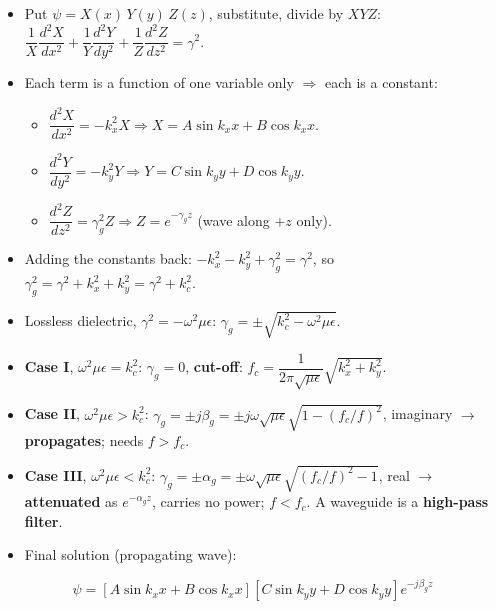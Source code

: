 \begin{itemize}
  \item Put $\psi = X(x)\,Y(y)\,Z(z)$, substitute, divide by $XYZ$:
    $\dfrac{1}{X}\dfrac{d^2X}{dx^2} + \dfrac{1}{Y}\dfrac{d^2Y}{dy^2}
    + \dfrac{1}{Z}\dfrac{d^2Z}{dz^2} = \gamma^2$.
  \item Each term is a function of one variable only $\Rightarrow$ each is a constant:
  \begin{itemize}
    \item $\dfrac{d^2X}{dx^2} = -k_x^2 X \Rightarrow X = A\sin k_x x + B\cos k_x x$.
    \item $\dfrac{d^2Y}{dy^2} = -k_y^2 Y \Rightarrow Y = C\sin k_y y + D\cos k_y y$.
    \item $\dfrac{d^2Z}{dz^2} = \gamma_g^2 Z \Rightarrow Z = e^{-\gamma_g z}$ (wave along $+z$ only).
  \end{itemize}
  \item Adding the constants back: $-k_x^2 - k_y^2 + \gamma_g^2 = \gamma^2$, so
    $\boxed{\gamma_g^2 = \gamma^2 + k_x^2 + k_y^2 = \gamma^2 + k_c^2}$.
  \item Lossless dielectric, $\gamma^2 = -\omega^2\mu\epsilon$:
    $\boxed{\gamma_g = \pm\sqrt{k_c^2 - \omega^2\mu\epsilon}}$.
\end{itemize}

\par{}
\begin{itemize}
  \item \textbf{Case I}, $\omega^2\mu\epsilon = k_c^2$: $\gamma_g = 0$, \textbf{cut-off}:
    $f_c = \dfrac{1}{2\pi\sqrt{\mu\epsilon}}\sqrt{k_x^2 + k_y^2}$.
  \item \textbf{Case II}, $\omega^2\mu\epsilon > k_c^2$:
    $\gamma_g = \pm j\beta_g = \pm j\omega\sqrt{\mu\epsilon}\sqrt{1 - (f_c/f)^2}$, imaginary
    $\rightarrow$ \textbf{propagates}; needs $f > f_c$.
  \item \textbf{Case III}, $\omega^2\mu\epsilon < k_c^2$:
    $\gamma_g = \pm\alpha_g = \pm\omega\sqrt{\mu\epsilon}\sqrt{(f_c/f)^2 - 1}$, real
    $\rightarrow$ \textbf{attenuated} as $e^{-\alpha_g z}$, carries no power; $f < f_c$.
    A waveguide is a \textbf{high-pass filter}.
  \item Final solution (propagating wave):
\end{itemize}
\[ \psi = \left[A\sin k_x x + B\cos k_x x\right]\left[C\sin k_y y + D\cos k_y y\right]e^{-j\beta_g z} \]


